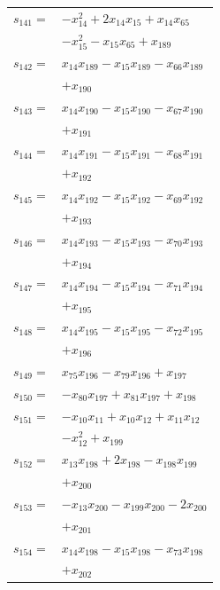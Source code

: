 \begin{longtable}{@{}r@{\;}l@{}}
\(s_{141}=\) & \(\displaystyle -x_{14}^{2} +2x_{14}x_{15} +x_{14}x_{65}\) \\
 & \(\displaystyle -x_{15}^{2} -x_{15}x_{65} +x_{189}\) \\[3pt]
\(s_{142}=\) & \(\displaystyle x_{14}x_{189} -x_{15}x_{189} -x_{66}x_{189}\) \\
 & \(\displaystyle +x_{190}\) \\[3pt]
\(s_{143}=\) & \(\displaystyle x_{14}x_{190} -x_{15}x_{190} -x_{67}x_{190}\) \\
 & \(\displaystyle +x_{191}\) \\[3pt]
\(s_{144}=\) & \(\displaystyle x_{14}x_{191} -x_{15}x_{191} -x_{68}x_{191}\) \\
 & \(\displaystyle +x_{192}\) \\[3pt]
\(s_{145}=\) & \(\displaystyle x_{14}x_{192} -x_{15}x_{192} -x_{69}x_{192}\) \\
 & \(\displaystyle +x_{193}\) \\[3pt]
\(s_{146}=\) & \(\displaystyle x_{14}x_{193} -x_{15}x_{193} -x_{70}x_{193}\) \\
 & \(\displaystyle +x_{194}\) \\[3pt]
\(s_{147}=\) & \(\displaystyle x_{14}x_{194} -x_{15}x_{194} -x_{71}x_{194}\) \\
 & \(\displaystyle +x_{195}\) \\[3pt]
\(s_{148}=\) & \(\displaystyle x_{14}x_{195} -x_{15}x_{195} -x_{72}x_{195}\) \\
 & \(\displaystyle +x_{196}\) \\[3pt]
\(s_{149}=\) & \(\displaystyle x_{75}x_{196} -x_{79}x_{196} +x_{197}\) \\[3pt]
\(s_{150}=\) & \(\displaystyle -x_{80}x_{197} +x_{81}x_{197} +x_{198}\) \\[3pt]
\(s_{151}=\) & \(\displaystyle -x_{10}x_{11} +x_{10}x_{12} +x_{11}x_{12}\) \\
 & \(\displaystyle -x_{12}^{2} +x_{199}\) \\[3pt]
\(s_{152}=\) & \(\displaystyle x_{13}x_{198} +2x_{198} -x_{198}x_{199}\) \\
 & \(\displaystyle +x_{200}\) \\[3pt]
\(s_{153}=\) & \(\displaystyle -x_{13}x_{200} -x_{199}x_{200} -2x_{200}\) \\
 & \(\displaystyle +x_{201}\) \\[3pt]
\(s_{154}=\) & \(\displaystyle x_{14}x_{198} -x_{15}x_{198} -x_{73}x_{198}\) \\
 & \(\displaystyle +x_{202}\) \\[3pt]
\end{longtable}
\endgroup
